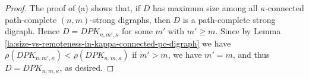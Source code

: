 \documentclass[10pt,a4paper]{amsart}
\begin{document}
\begin{proof}
The proof of (a) shows that, if $D$ has maximum size among all $\kappa$-connected
path-complete $(n,m)$-strong digraphs, then $D$ is a path-complete strong digraph. Hence $D=DPK_{n,m',\kappa}$ for some $m'$ with $m' \geq m$. Since by Lemma \ref{la:size-vs-remoteness-in-kappa-connected-pc-digraph} we have 
$\rho(DPK_{n,m',\kappa}) < \rho(DPK_{n,m,\kappa})$ if $m'>m$, we have $m'=m$, 
and thus $D=DPK_{n,m,\kappa}$, as desired. 
\end{proof}
\end{document}
